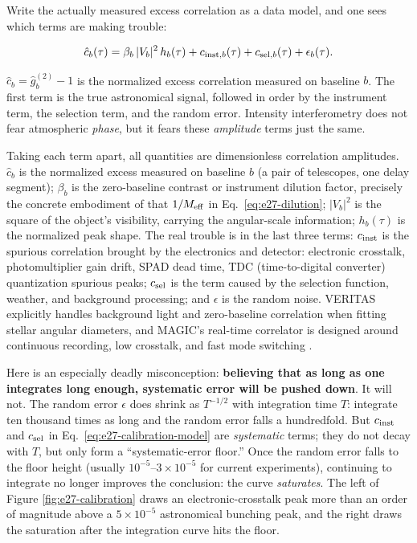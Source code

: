 Write the actually measured excess correlation as a data model, and one sees which terms are making trouble:

\begin{equation}
  \hat c_b(\tau)=
  \beta_b\,|V_b|^2\,h_b(\tau)
  +c_{{\rm inst},b}(\tau)
  +c_{{\rm sel},b}(\tau)
  +\epsilon_b(\tau).
  \label{eq:e27-calibration-model}
\end{equation}
\begin{formulaexplain}
\(\hat c_b=\hat g_b^{(2)}-1\) is the normalized excess correlation measured on baseline \(b\). The first term is the true astronomical signal, followed in order by the instrument term, the selection term, and the random error. Intensity interferometry does not fear atmospheric \emph{phase}, but it fears these \emph{amplitude} terms just the same.
\end{formulaexplain}

Taking each term apart, all quantities are dimensionless correlation amplitudes. \(\hat c_b\) is the normalized excess measured on baseline \(b\) (a pair of telescopes, one delay segment); \(\beta_b\) is the zero-baseline contrast or instrument dilution factor, precisely the concrete embodiment of that \(1/M_{\rm eff}\) in Eq.\ \eqref{eq:e27-dilution}; \(|V_b|^2\) is the square of the object's visibility, carrying the angular-scale information; \(h_b(\tau)\) is the normalized peak shape. The real trouble is in the last three terms: \(c_{\rm inst}\) is the spurious correlation brought by the electronics and detector: electronic crosstalk, photomultiplier gain drift, SPAD dead time, TDC (time-to-digital converter) quantization spurious peaks; \(c_{\rm sel}\) is the term caused by the selection function, weather, and background processing; and \(\epsilon\) is the random noise. VERITAS explicitly handles background light and zero-baseline correlation when fitting stellar angular diameters, and MAGIC's real-time correlator is designed around continuous recording, low crosstalk, and fast mode switching \citep{2020NatAs...4.1164A,2024MNRAS.529.4387A,2024ApJ...966...28A}.

Here is an especially deadly misconception: \textbf{believing that as long as one integrates long enough, systematic error will be pushed down}. It will not. The random error \(\epsilon\) does shrink as \(T^{-1/2}\) with integration time \(T\): integrate ten thousand times as long and the random error falls a hundredfold. But \(c_{\rm inst}\) and \(c_{\rm sel}\) in Eq.\ \eqref{eq:e27-calibration-model} are \emph{systematic} terms; they do not decay with \(T\), but only form a ``systematic-error floor.'' Once the random error falls to the floor height (usually \(10^{-5}\)--\(3\times10^{-5}\) for current experiments), continuing to integrate no longer improves the conclusion: the curve \emph{saturates}. The left of Figure \ref{fig:e27-calibration} draws an electronic-crosstalk peak more than an order of magnitude above a \(5\times10^{-5}\) astronomical bunching peak, and the right draws the saturation after the integration curve hits the floor.

